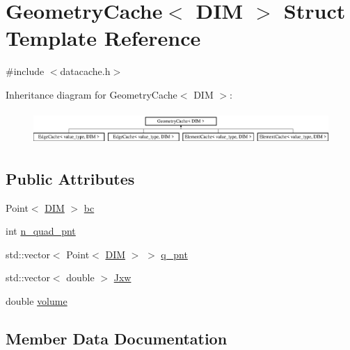 \hypertarget{struct_geometry_cache}{}\section{Geometry\+Cache$<$ D\+IM $>$ Struct Template Reference}
\label{struct_geometry_cache}


{\ttfamily \#include $<$datacache.\+h$>$}

Inheritance diagram for Geometry\+Cache$<$ D\+IM $>$\+:\begin{figure}[H]
\begin{center}
\leavevmode
\includegraphics[height=1.278539cm]{struct_geometry_cache}
\end{center}
\end{figure}
\subsection*{Public Attributes}
\begin{DoxyCompactItemize}
\item 
Point$<$ \mbox{\hyperlink{complex__node___t_h_f_e_m_2uiexp_8h_a589b8b9bfdf714f736059845d568b597}{D\+IM}} $>$ \mbox{\hyperlink{struct_geometry_cache_a6312e0dedafa80d8a8aae0f9a99ec16d}{bc}}
\item 
int \mbox{\hyperlink{struct_geometry_cache_aa053ebb5dfb918e59595f4322d32bce6}{n\+\_\+quad\+\_\+pnt}}
\item 
std\+::vector$<$ Point$<$ \mbox{\hyperlink{complex__node___t_h_f_e_m_2uiexp_8h_a589b8b9bfdf714f736059845d568b597}{D\+IM}} $>$ $>$ \mbox{\hyperlink{struct_geometry_cache_a0af88a99d5de84b452a81e50ee60f246}{q\+\_\+pnt}}
\item 
std\+::vector$<$ double $>$ \mbox{\hyperlink{struct_geometry_cache_a31b6482011d3cc2bde276b0efce4f797}{Jxw}}
\item 
double \mbox{\hyperlink{struct_geometry_cache_ad6c7cd9d170b7fbcc819312dde144e37}{volume}}
\end{DoxyCompactItemize}


\subsection{Member Data Documentation}
\mbox{\label{struct_geometry_cache_a6312e0dedafa80d8a8aae0f9a99ec16d}} 
